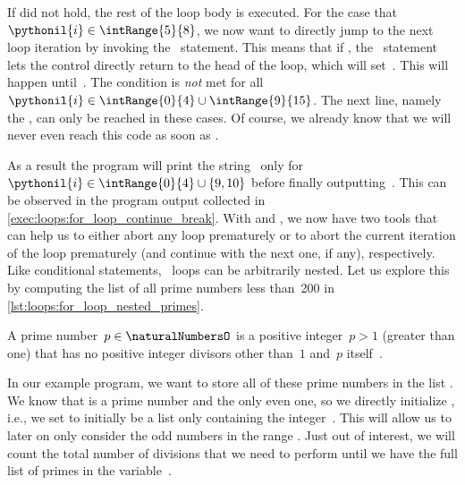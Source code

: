 If  did not hold, the rest of the loop body is executed.
For the case that $\pythonil{i}\in\intRange{5}{8}$, we now want to directly jump to the next loop iteration by invoking the ~statement.
This means that if , the ~statement lets the control directly return to the head of the loop, which will set~.
This will happen until~.
The condition  is \emph{not} met for all $\pythonil{i}\in\intRange{0}{4}\cup\intRange{9}{15}$.
The next line, namely the , can only be reached in these cases.
Of course, we already know that we will never even reach this code as soon as .

As a result the program will print the string~ only for~$\pythonil{i}\in\intRange{0}{4}\cup\{9, 10\}$ before finally outputting~.
This can be observed in the program output collected in \cref{exec:loops:for_loop_continue_break}.
With  and , we now have two tools that can help us to either abort any loop prematurely or to abort the current iteration of the loop prematurely (and continue with the next one, if any), respectively.%
%
\FloatBarrier%
\endhsection%
%
%
%
%
%
Like conditional statements, ~loops can be arbitrarily nested.
Let us explore this by computing the list of all prime numbers less than~200 in \cref{lst:loops:for_loop_nested_primes}.%
%
\begin{definition}%
A prime number~$p\in\naturalNumbersO$ is a positive integer~$p>1$ (greater than one) that has no positive integer divisors other than~$1$ and~$p$ itself~\cite{W2024PN,CP2005PNACP,R1994PNACMFF}.%
\end{definition}%
%
In our example program, we want to store all of these prime numbers in the list .
We know that  is a prime number and the only even one, so we directly initialize , i.e., we set  to initially be a list only containing the integer~.
This will allow us to later on only consider the odd numbers in the range .
Just out of interest, we will count the total number of divisions that we need to perform until we have the full list of primes in the variable~.%
